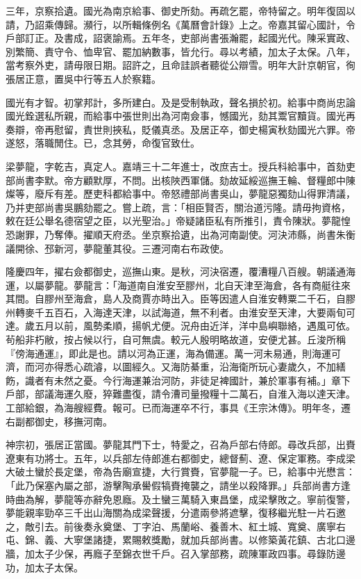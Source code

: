 \begin{pinyinscope}
三年，京察拾遺。國光為南京給事、御史所劾。再疏乞罷，帝特留之。明年復固以請，乃詔乘傳歸。瀕行，以所輯條例名《萬曆會計錄》上之。帝嘉其留心國計，令戶部訂正。及書成，詔褒諭焉。五年冬，吏部尚書張瀚罷，起國光代。陳采實政、別繁簡、責守令、恤卑官、罷加納數事，皆允行。尋以考績，加太子太保。八年，當考察外吏，請毋限日期。詔許之，且命詿誤者聽從公辯雪。明年大計京朝官，徇張居正意，置吳中行等五人於察籍。

國光有才智。初掌邦計，多所建白。及是受制執政，聲名損於初。給事中商尚忠論國光銓選私所親，而給事中張世則出為河南僉事，憾國光，劾其鬻官黷貨。國光再奏辯，帝再慰留，責世則挾私，貶儀真丞。及居正卒，御史楊寅秋劾國光六罪。帝遂怒，落職閒住。已，念其勞，命復官致仕。

梁夢龍，字乾吉，真定人。嘉靖三十二年進士，改庶吉士。授兵科給事中，首劾吏部尚書李默。帝方顧默厚，不問。出核陜西軍儲。劾故延綏巡撫王輪、督糧郎中陳燦等，廢斥有差。歷吏科都給事中。帝怒禮部尚書吳山，夢龍惡獨劾山得罪清議，乃并吏部尚書吳鵬劾罷之。嘗上疏，言：「相臣賢否，關治道污隆。請毋拘資格，敕在廷公舉名德宿望之臣，以光聖治。」帝疑諸臣私有所推引，責令陳狀。夢龍惶恐謝罪，乃奪俸。擢順天府丞。坐京察拾遺，出為河南副使。河決沛縣，尚書朱衡議開徐、邳新河，夢龍董其役。三遷河南右布政使。

隆慶四年，擢右僉都御史，巡撫山東。是秋，河決宿遷，覆漕糧八百艘。朝議通海運，以屬夢龍。夢龍言：「海道南自淮安至膠州，北自天津至海倉，各有商艇往來其間。自膠州至海倉，島人及商賈亦時出入。臣等因遣人自淮安轉粟二千石，自膠州轉麥千五百石，入海達天津，以試海道，無不利者。由淮安至天津，大要兩旬可達。歲五月以前，風勢柔順，揚帆尤便。況舟由近洋，洋中島嶼聯絡，遇風可依。茍船非朽敝，按占候以行，自可無虞。較元人殷明略故道，安便尤甚。丘浚所稱『傍海通運』，即此是也。請以河為正運，海為備運。萬一河未易通，則海運可濟，而河亦得悉心疏濬，以圖經久。又海防綦重，沿海衛所玩心妻歲久，不加繕飭，識者有未然之憂。今行海運兼治河防，非徒足裨國計，兼於軍事有補。」章下戶部，部議海運久廢，猝難盡復，請令漕司量撥糧十二萬石，自淮入海以達天津。工部給銀，為海艘經費。報可。已而海運卒不行，事具《王宗沐傳》。明年冬，遷右副都御史，移撫河南。

神宗初，張居正當國。夢龍其門下士，特愛之，召為戶部右侍郎。尋改兵部，出賚遼東有功將士。五年，以兵部左侍郎進右都御史，總督薊、遼、保定軍務。李成梁大破土蠻於長定堡，帝為告廟宣捷，大行賞賚，官夢龍一子。已，給事中光懋言：「此乃保塞內屬之部，游擊陶承嚳假犒賚掩襲之，請坐以殺降罪。」兵部尚書方逢時曲為解，夢龍等亦辭免恩廕。及土蠻三萬騎入東昌堡，成梁擊敗之。寧前復警，夢能親率勁卒三千出山海關為成梁聲援，分遣兩參將遮擊，復移繼光駐一片石邀之，敵引去。前後奏永奠堡、丁字泊、馬蘭峪、養善木、紅土城、寬奠、廣寧右屯、錦、義、大寧堡諸捷，累賜敕獎勵，就加兵部尚書。以修築黃花鎮、古北口邊牆，加太子少保，再廕子至錦衣世千戶。召入掌部務，疏陳軍政四事。尋錄防邊功，加太子太保。


\end{pinyinscope}
